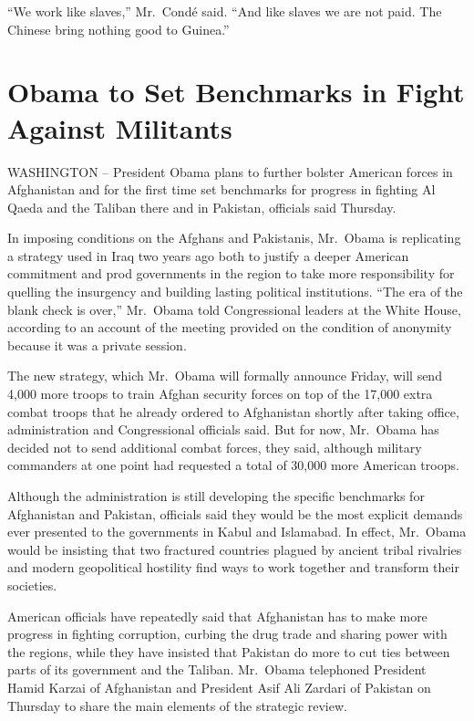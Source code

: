\documentclass[12pt,a4paper,onecolumn]{article}
\begin{document}
\begin{CJK*}{GBK}{song}
``We work like slaves,'' Mr.~Cond\'e said. ``And like slaves we are not paid. The Chinese bring
nothing good to Guinea.''

\section{Obama to Set Benchmarks in Fight Against Militants}

WASHINGTON -- President Obama plans to further bolster American forces in Afghanistan and for the
first time set benchmarks for progress in fighting Al Qaeda and the Taliban there and in Pakistan,
officials said Thursday.

In imposing conditions on the Afghans and Pakistanis, Mr.~Obama is replicating a strategy used in
Iraq two years ago both to justify a deeper American commitment and prod governments in the region
to take more responsibility for quelling the insurgency and building lasting political institutions.
``The era of the blank check is over,'' Mr.~Obama told Congressional leaders at the White House,
according to an account of the meeting provided on the condition of anonymity because it was a
private session.

The new strategy, which Mr.~Obama will formally announce Friday, will send 4,000 more troops to
train Afghan security forces on top of the 17,000 extra combat troops that he already ordered to
Afghanistan shortly after taking office, administration and Congressional officials said. But for
now, Mr.~Obama has decided not to send additional combat forces, they said, although military
commanders at one point had requested a total of 30,000 more American troops.

Although the administration is still developing the specific benchmarks for Afghanistan and
Pakistan, officials said they would be the most explicit demands ever presented to the governments
in Kabul and Islamabad. In effect, Mr.~Obama would be insisting that two fractured countries plagued
by ancient tribal rivalries and modern geopolitical hostility find ways to work together and
transform their societies.

American officials have repeatedly said that Afghanistan has to make more progress in fighting
corruption, curbing the drug trade and sharing power with the regions, while they have insisted that
Pakistan do more to cut ties between parts of its government and the Taliban. Mr.~Obama telephoned
President Hamid Karzai of Afghanistan and President Asif Ali Zardari of Pakistan on Thursday to
share the main elements of the strategic review.


\end{CJK*}
\end{document}
